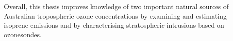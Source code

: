 Overall, this thesis improves knowledge of two important natural sources of Australian tropospheric ozone concentrations by examining and estimating isoprene emissions and by characterising stratospheric intrusions based on ozonesondes.
  
